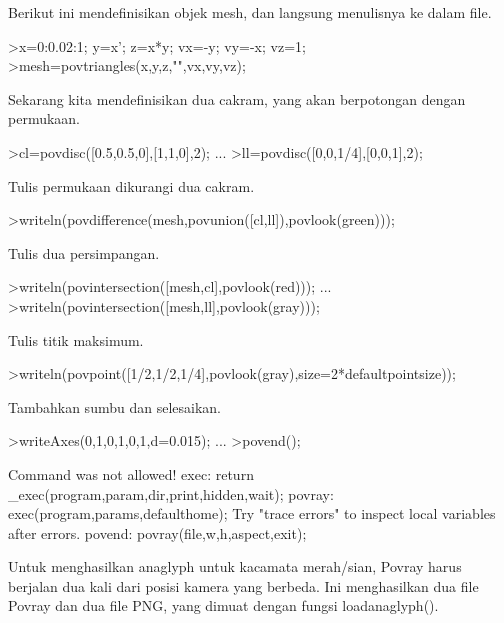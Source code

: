 \documentclass{article}
\begin{document}
\begin{eulernotebook}
\begin{eulercomment}
\begin{eulercomment}
\begin{eulercomment}
Berikut ini mendefinisikan objek mesh, dan langsung menulisnya ke
dalam file.
\end{eulercomment}
\begin{eulerprompt}
>x=0:0.02:1; y=x'; z=x*y; vx=-y; vy=-x; vz=1;
>mesh=povtriangles(x,y,z,"",vx,vy,vz);
\end{eulerprompt}
\begin{eulercomment}
Sekarang kita mendefinisikan dua cakram, yang akan berpotongan dengan
permukaan.
\end{eulercomment}
\begin{eulerprompt}
>cl=povdisc([0.5,0.5,0],[1,1,0],2); ...
>ll=povdisc([0,0,1/4],[0,0,1],2);
\end{eulerprompt}
\begin{eulercomment}
Tulis permukaan dikurangi dua cakram.
\end{eulercomment}
\begin{eulerprompt}
>writeln(povdifference(mesh,povunion([cl,ll]),povlook(green)));
\end{eulerprompt}
\begin{eulercomment}
Tulis dua persimpangan.
\end{eulercomment}
\begin{eulerprompt}
>writeln(povintersection([mesh,cl],povlook(red))); ...
>writeln(povintersection([mesh,ll],povlook(gray)));
\end{eulerprompt}
\begin{eulercomment}
Tulis titik maksimum.
\end{eulercomment}
\begin{eulerprompt}
>writeln(povpoint([1/2,1/2,1/4],povlook(gray),size=2*defaultpointsize));
\end{eulerprompt}
\begin{eulercomment}
Tambahkan sumbu dan selesaikan.
\end{eulercomment}
\begin{eulerprompt}
>writeAxes(0,1,0,1,0,1,d=0.015); ...
>povend();
\end{eulerprompt}
\begin{euleroutput}
  Command was not allowed!
  exec:
      return _exec(program,param,dir,print,hidden,wait);
  povray:
      exec(program,params,defaulthome);
  Try "trace errors" to inspect local variables after errors.
  povend:
      povray(file,w,h,aspect,exit); 
\end{euleroutput}
\begin{eulercomment}
Untuk menghasilkan anaglyph untuk kacamata merah/sian, Povray harus
berjalan dua kali dari posisi kamera yang berbeda. Ini menghasilkan
dua file Povray dan dua file PNG, yang dimuat dengan fungsi
loadanaglyph().


\end{eulercomment}
\end{eulercomment}
\end{eulercomment}
\end{eulernotebook}
\end{document}
